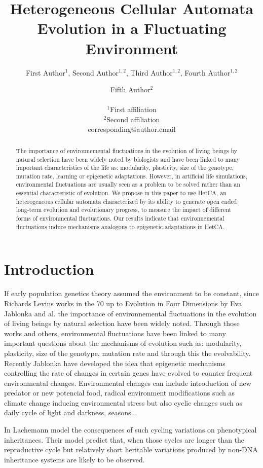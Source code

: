 \documentclass[letterpaper]{article}
\title{Heterogeneous Cellular Automata Evolution in a Fluctuating Environment}
\author{First Author$^{1}$, Second Author$^{1,2}$, Third Author$^{1,2}$, Fourth Author$^{1,2}$ \and Fifth Author$^2$ \\
\mbox{}\\
$^1$First affiliation  \\
$^2$Second affiliation \\
corresponding@author.email}
\begin{document}
\maketitle

\begin{abstract}
The importance of environnemental fluctuations in the evolution of living beings by natural selection have been widely noted by biologists and have been linked to many important characteristics of the life as: modularity, plasticity, size of the genotype, mutation rate, learning or epigenetic adaptations. However, in artificial life simulations, environmental fluctuations are usually seen as a problem to be solved rather than an essential characteristic of evolution. We propose in this paper to use HetCA, an heterogeneous cellular automata characterized by its ability to generate open ended long-term evolution and evolutionary progress, to measure the impact of different forms of environmental fluctuations. Our results indicate that environnemental fluctuations induce mechanisms analogous to epigenetic adaptations in HetCA.
\end{abstract}





\section{Introduction}
If early population genetics theory assumed the environment to be constant, since Richards Levins works \cite{levins1968evolution} in the 70 up to Evolution in Four Dimensions by Eva Jablonka and al. \cite{jablonka2014evolution} the importance of environnemental fluctuations in the evolution of living beings by natural selection have been widely noted. Through those works and others, environmental fluctuations have been linked to many important questions about the mechanisms of evolution such as: modularity, plasticity, size of the genotype, mutation rate and through this the evolvability. Recently Jablonka\cite{jablonka2014evolution} have developed the idea that epigenetic mechanisms controlling the rate of changes in certain genes have evolved to counter frequent environmental changes. 
Environmental changes can include introduction of new predator or new potencial food, radical environment modifications such as climate change inducing environmental stress but also cyclic changes such as daily cycle of light and darkness, seasons...  

In \cite{lachmann1996inheritance} Lachemann model the consequences of such cycling variations on phenotypical inheritances. Their model predict that, when those cycles are longer than the reproductive cycle but relatively short heritable variations produced by non-DNA inheritance systems are likely to be observed.
\end{document}

